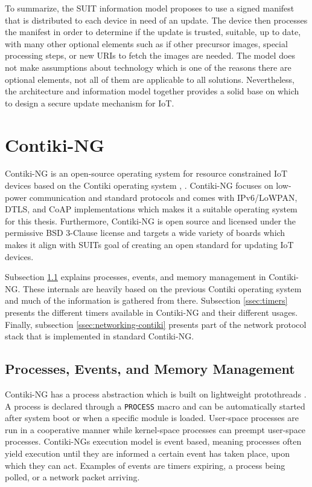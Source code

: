 \documentclass[0-thesis.tex]{subfiles}
\begin{document}

To summarize, the SUIT information model proposes to use a signed manifest that is
distributed to each device in need of an update. The device then processes the manifest in
order to determine if the update is trusted, suitable, up to date, with many other
optional elements such as if other precursor images, special processing steps, or new URIs
to fetch the images are needed. The model does not make assumptions about technology which
is one of the reasons there are optional elements, not all of them are applicable to all
solutions. Nevertheless, the architecture and information model together provides a solid
base on which to design a secure update mechanism for IoT.

\section{Contiki-NG}
\label{ssec:contiki-ng}
Contiki-NG is an open-source operating system for resource constrained IoT devices based
on the Contiki operating system \parencite{contiki-ng-github}, \parencite{contiki-github}.
Contiki-NG focuses on low-power communication and standard protocols and comes with
IPv6/LoWPAN, DTLS, and CoAP implementations which makes it a suitable operating system for
this thesis. Furthermore, Contiki-NG is open source and licensed under the permissive BSD
3-Clause license and targets a wide variety of boards which makes it align with SUITs goal
of creating an open standard for updating IoT devices.

Subsection \ref{ssec:process-event-memory} explains processes, events, and memory
management in Contiki-NG. These internals are heavily based on the previous Contiki
operating system and much of the information is gathered from there. Subsection
\ref{ssec:timers} presents the different timers available in Contiki-NG and their
different usages. Finally, subsection \ref{ssec:networking-contiki} presents part of the
network protocol stack that is implemented in standard Contiki-NG.

\subsection{Processes, Events, and Memory Management}
\label{ssec:process-event-memory}
Contiki-NG has a process abstraction which is built on lightweight protothreads
\parencite{protothreads}. A process is declared through a \texttt{PROCESS} macro and can
be automatically started after system boot or when a specific module is loaded. User-space
processes are run in a cooperative manner while kernel-space processes can preempt
user-space processes. Contiki-NGs execution model is event based, meaning processes often
yield execution until they are informed a certain event has taken place, upon which they
can act. Examples of events are timers expiring, a process being polled, or a network
packet arriving. 
\end{document}
